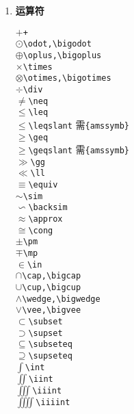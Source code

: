 \documentclass[fontset=windows]{article}
\newcommand{\q}{\quad}
\begin{document}
\begin{multicols}{2}
\begin{enumerate}
\item \textbf{运算符}
\vspace{-5mm}
\begin{multicols}{2} 
$ + $\q \verb|+| \\
$ \odot $\q \verb|\odot,\bigodot| \\
$ \oplus $\q \verb|\oplus,\bigoplus|\\
$ \times $\q \verb|\times| \\
$ \otimes $\q \verb|\otimes,\bigotimes| \\
$ \div $\q \verb|\div| \\
$ \neq $\q \verb|\neq| \\
$ \leq $\q \verb|\leq| \\
$ \leqslant $\q \verb|\leqslant| {\footnotesize 需\verb|{amssymb}|} \\
$ \geq $\q \verb|\geq| \\
$ \geqslant $\q \verb|\geqslant| {\footnotesize 需\verb|{amssymb}|} \\
$ \gg $\q \verb|\gg| \\
$ \ll $\q \verb|\ll| \\
$ \equiv $\q \verb|\equiv| \\%
$ \sim $\q \verb|\sim| \\%
$ \backsim $\q \verb|\backsim| \\
$ \approx $\q \verb|\approx| \\%
$ \cong $\q \verb|\cong| \\%
$ \pm $\q \verb|\pm| \\
$ \mp $\q \verb|\mp| \\
$ \in $\q \verb|\in| \\
$ \cap $\q \verb|\cap,\bigcap| \\
$ \cup $\q \verb|\cup,\bigcup| \\
$ \wedge $\q \verb|\wedge,\bigwedge| \\
$ \vee $\q \verb|\vee,\bigvee| \\
$ \subset $\q \verb|\subset| \\
$ \supset $\q \verb|\supset| \\
$ \subseteq $\q \verb|\subseteq| \\
$ \supseteq $\q \verb|\supseteq| \\
$ \int $\q \verb|\int| \\
$ \iint $\q \verb|\iint| \\
$ \iiint $\q \verb|\iiint| \\
$ \iiiint $\q \verb|\iiiint| \\

\end{multicols}
\end{enumerate}
\end{multicols}
\end{document}

